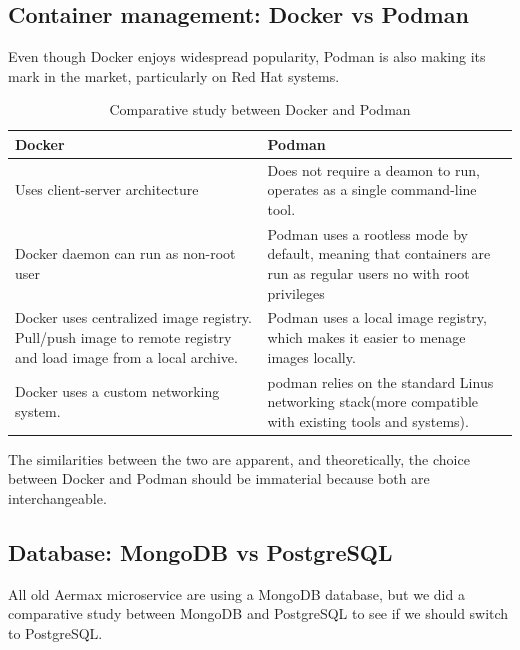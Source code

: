 \subsection{Container management: Docker vs Podman}
Even though Docker enjoys widespread popularity, Podman is also making its mark in the market, particularly on Red Hat systems.


\begin{table}[h!]
  \centering
  \renewcommand{\arraystretch}{1.5} 
  \caption{Comparative study between Docker and Podman}
  \label{tab: comparative_study_between_Docker_and_Podman}
  \begin{tabularx}{\textwidth}{|>{\centering\arraybackslash}X|>{\centering\arraybackslash}X|}
      \hline
      \rowcolor{blue!20} 
      \textbf{Docker} & \textbf{Podman} \\
      \hline
      Uses client-server architecture & Does not require a deamon to run, operates as a single command-line tool. \\
      \hline
      Docker daemon can run as non-root user & Podman uses a rootless mode by default, meaning that containers are run as regular users no with root privileges \\
      \hline
      Docker uses centralized image registry. Pull/push image to remote registry and load image from a local archive. & Podman uses a local image registry, which makes it easier to menage images locally.  \\
      \hline
      Docker uses a custom networking system. & podman relies on the standard Linus networking stack(more compatible with existing tools and systems).  \\
      \hline
  \end{tabularx}
\end{table}
The similarities between the two are apparent, and theoretically, the choice between Docker and Podman should be immaterial because both are interchangeable.


\subsection{Database: MongoDB vs PostgreSQL}
All old Aermax microservice are using a MongoDB database, but we did a comparative study between MongoDB and PostgreSQL to see if we should switch to PostgreSQL.


